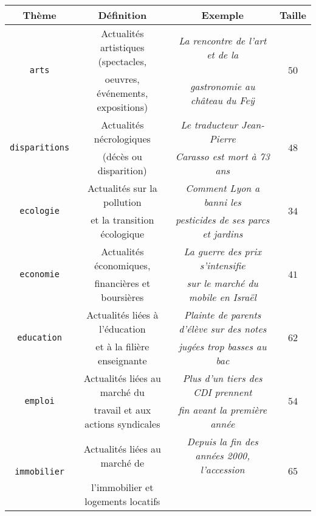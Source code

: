 		\begin{table}[!htb]
			\begin{center}
			\begin{scriptsize}
			\begin{tabular}{|c|c|c|c|}
			
				\hline
				\rowcolor{colorTableHeader!15}
				\textbf{Thème}
					& \textbf{Définition}
					& \textbf{Exemple}
					& \textbf{Taille}
					\tabularnewline
					\hline \hline
				\multirow{2}{*}{\texttt{arts}}
					& Actualités artistiques (spectacles,
					& \textit{La rencontre de l'art et de la }
					& \multirow{2}{*}{$50$}
					\tabularnewline
					& oeuvres, événements, expositions)
					& \textit{gastronomie au château du Feÿ}
					&
					\tabularnewline
					\hline
				\multirow{2}{*}{\texttt{disparitions}}
					& Actualités nécrologiques 
					& \textit{Le traducteur Jean-Pierre}
					& \multirow{2}{*}{$48$}
					\tabularnewline
					& (décès ou disparition)
					& \textit{Carasso est mort à 73 ans}
					&
					\tabularnewline
					\hline
				\multirow{2}{*}{\texttt{ecologie}}
					& Actualités sur la pollution
					& \textit{Comment Lyon a banni les}
					& \multirow{2}{*}{$34$}
					\tabularnewline
					& et la transition écologique
					& \textit{pesticides de ses parcs et jardins}
					&
					\tabularnewline
					\hline
				\multirow{2}{*}{\texttt{economie}}
					& Actualités économiques,
					& \textit{La guerre des prix s'intensifie}
					& \multirow{2}{*}{$41$}
					\tabularnewline
					& financières et boursières
					& \textit{sur le marché du mobile en Israël}
					&
					\tabularnewline
					\hline
				\multirow{2}{*}{\texttt{education}}
					& Actualités liées à l'éducation
					& \textit{Plainte de parents d'élève sur des notes}
					& \multirow{2}{*}{$62$}
					\tabularnewline
					& et à la filière enseignante
					& \textit{jugées trop basses au bac}
					&
					\tabularnewline
					\hline
				\multirow{2}{*}{\texttt{emploi}}
					& Actualités liées au marché du
					& \textit{Plus d'un tiers des CDI prennent}
					& \multirow{2}{*}{$54$}
					\tabularnewline
					& travail et aux actions syndicales
					& \textit{ fin avant la première année}
					&
					\tabularnewline
					\hline
				\multirow{2}{*}{\texttt{immobilier}}
					& Actualités liées au marché de
					& \textit{Depuis la fin des années 2000, l'accession}
					& \multirow{2}{*}{$65$}
					\tabularnewline
					& l'immobilier et logements locatifs

\end{tabular}
\end{scriptsize}
\end{center}
\end{table}

